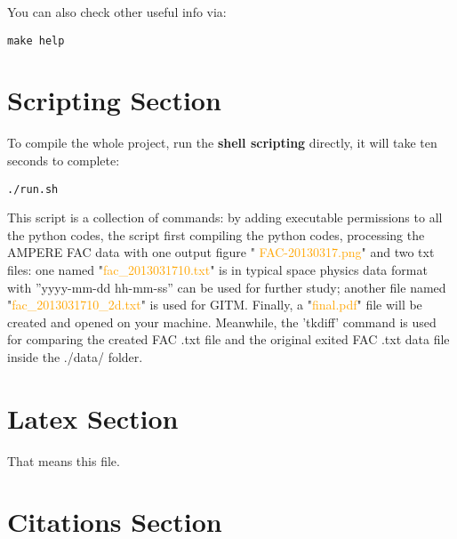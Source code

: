 \documentclass[12pt, letterpaper]{article} %
\begin{document}
\noindent You can also check other useful info via:
\begin{verbatim}
make help
\end{verbatim} %

\section{Scripting Section} %

\noindent To compile the whole project, run the \textbf{shell scripting} directly, it will take ten seconds to complete:

\begin{verbatim}
./run.sh
\end{verbatim} %

\noindent This script is a collection of commands: by adding executable permissions to all the python codes, the script first compiling the python codes, processing the AMPERE FAC data with one output figure " \textcolor{orange}{FAC-20130317.png}" and two txt files: one named "\textcolor{orange}{fac\_{}2013031710.txt}" is in typical space physics data format with ''yyyy-mm-dd hh-mm-ss'' can be used for further study; another file named "\textcolor{orange}{fac\_{}2013031710\_{}2d.txt}" is used for GITM. Finally, a "\textcolor{orange}{final.pdf}" file will be created and opened on your machine. Meanwhile, the 'tkdiff' command is used for comparing the created FAC .txt file and the original exited FAC .txt data file inside the ./data/ folder.


\section{Latex Section} %

\noindent That means this file. 



\section{Citations Section} %
\end{document}
